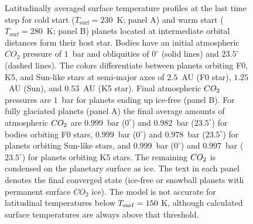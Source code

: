 \documentclass[fleqn,usenatbib]{mnras}
\begin{document}
\begin{figure}
    \caption{Latitudinally averaged surface temperature profiles at the last time step for cold start ($T_{\mathrm{surf}}=230$~K; panel A) and warm start ($T_{\mathrm{surf}}=280$~K; panel B) planets located at intermediate orbital distances form their host star. Bodies have an initial atmospheric $CO_{\mathrm{2}}$ pressure of $1$~bar and obliquities of $0^{\circ}$ (solid lines) and $23.5^{\circ}$ (dashed lines). The colors differentiate between planets orbiting F0, K5, and Sun-like stars at semi-major axes of $2.5$~AU (F0 star), $1.25$~AU (Sun), and $0.53$~AU (K5 star). Final atmospheric $CO_{\rm 2}$ pressures are $1$~bar for planets ending up ice-free (panel B). For fully glaciated planets (panel A) the final average amounts of atmospheric $CO_{\rm 2}$ are $0.999$~bar ($0^{\circ}$) and $0.982$~bar ($23.5^{\circ}$) for bodies orbiting F0 stars, $0.999$~bar ($0^{\circ}$) and $0.978$~bar ($23.5^{\circ}$) for planets orbiting Sun-like stars, and $0.999$~bar ($0^{\circ}$) and $0.997$~bar ($23.5^{\circ}$) for planets orbiting K5 stars. The remaining $CO_{\rm 2}$ is condensed on the planetary surface as ice. The text in each panel denotes the final converged state  (ice-free or snowball planets with permanent surface $CO_{\mathrm 2}$ ice).  The model is not accurate for latitudinal temperatures below $T_{\rm surf}=150$ K, although calculated surface temperatures are always above that threshold.
    }
    \label{fig:comp_a0}
\end{figure}
\end{document}
